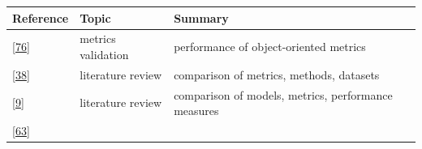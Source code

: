 \documentclass[]{book}
\begin{document}
\begin{longtable}[]{@{}lll@{}}
\toprule
\begin{minipage}[b]{0.23\columnwidth}\raggedright\strut
Reference\strut
\end{minipage} & \begin{minipage}[b]{0.18\columnwidth}\raggedright\strut
Topic\strut
\end{minipage} & \begin{minipage}[b]{0.50\columnwidth}\raggedright\strut
Summary\strut
\end{minipage}\tabularnewline
\midrule
\endhead
\begin{minipage}[t]{0.23\columnwidth}\raggedright\strut
{[}\protect\hyperlink{ref-Gyimothy2005}{76}{]}\strut
\end{minipage} & \begin{minipage}[t]{0.18\columnwidth}\raggedright\strut
metrics validation\strut
\end{minipage} & \begin{minipage}[t]{0.50\columnwidth}\raggedright\strut
performance of object-oriented metrics\strut
\end{minipage}\tabularnewline
\begin{minipage}[t]{0.23\columnwidth}\raggedright\strut
{[}\protect\hyperlink{ref-Catal2009review}{38}{]}\strut
\end{minipage} & \begin{minipage}[t]{0.18\columnwidth}\raggedright\strut
literature review\strut
\end{minipage} & \begin{minipage}[t]{0.50\columnwidth}\raggedright\strut
comparison of metrics, methods, datasets\strut
\end{minipage}\tabularnewline
\begin{minipage}[t]{0.23\columnwidth}\raggedright\strut
{[}\protect\hyperlink{ref-Arisholm2010}{9}{]}\strut
\end{minipage} & \begin{minipage}[t]{0.18\columnwidth}\raggedright\strut
literature review\strut
\end{minipage} & \begin{minipage}[t]{0.50\columnwidth}\raggedright\strut
comparison of models, metrics, performance measures\strut
\end{minipage}\tabularnewline
\begin{minipage}[t]{0.23\columnwidth}\raggedright\strut
{[}\protect\hyperlink{ref-DAmbros2010}{63}{]}\strut
\end{minipage} & \begin{minipage}[t]{0.18\columnwidth}\raggedright\strut

\end{minipage}
\end{longtable}
\end{document}
